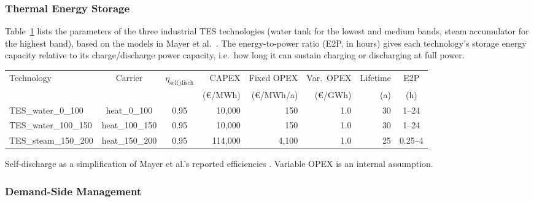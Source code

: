 \subsubsection{Thermal Energy Storage}

Table~\ref{table:SITES} lists the parameters of the three industrial TES technologies (water tank for the lowest and medium bands, steam accumulator for the highest band), based on the models in Mayer et al.\ \cite{Mayer2024}. The energy-to-power ratio (E2P, in hours) gives each technology's storage energy capacity relative to its charge/discharge power capacity, i.e.\ how long it can sustain charging or discharging at full power.

\begin{table}[h!]
	\centering
	\label{table:SITES}
	\begin{threeparttable}
	\begin{tabular}{lccrrrrc}
		\toprule
		Technology & Carrier & $\eta_{\mathrm{self\_disch}}$& CAPEX & Fixed OPEX & Var.\ OPEX & Lifetime & E2P \\
		 & & & (\euro/MWh) & (\euro/MWh/a) & (\euro/GWh) & (a) & (h) \\
		\midrule
		TES\_water\_0\_100 & heat\_0\_100 & 0.95& 10{,}000 & 150 & 1.0 & 30 & 1--24 \\
		TES\_water\_100\_150 & heat\_100\_150 & 0.95& 10{,}000 & 150 & 1.0 & 30 & 1--24 \\
		TES\_steam\_150\_200 & heat\_150\_200 & 0.95& 114{,}000 & 4{,}100 & 1.0 & 25 & 0.25--4 \\
		\bottomrule
	\end{tabular}
	\begin{tablenotes}
		\footnotesize
		\item[] Self-discharge as a simplification of Mayer et al.'s reported efficiencies \cite{Mayer2024}. Variable OPEX is an internal assumption.
	\end{tablenotes}
	\end{threeparttable}
\end{table}

\subsubsection{Demand-Side Management}

